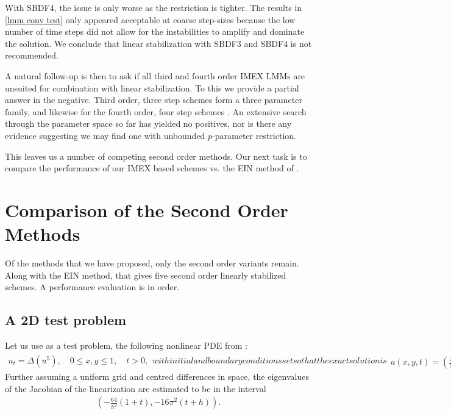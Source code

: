With SBDF4, the issue is only worse as the restriction is tighter. The results in \cref{lmm conv test} only appeared acceptable at coarse step-sizes because the low number of time steps did not allow for the instabilities to amplify and dominate the solution. We conclude that linear stabilization with SBDF3 and SBDF4  is not recommended. 

A natural follow-up is then to ask if all third and fourth order IMEX LMMs are unsuited for combination with linear stabilization. To this we provide a partial answer in the negative. Third order, three step schemes form a three parameter family, and likewise for the fourth order, four step schemes \cite{ascher1995implicit}. An extensive search through the parameter space so far has yielded no positives, nor is there any evidence suggesting we may find one with unbounded $p$-parameter restriction.

This leaves us a number of competing second order methods. Our next task is to compare the performance of our IMEX based schemes vs. the EIN method of \cite{duchemin2014explicit}.

\section{Comparison of the Second Order Methods}
Of the methods that we have proposed, only the second order variants remain. Along with the EIN method, that gives five second order linearly stabilized schemes. A performance evaluation is in order.

\subsection{A 2D test problem}
Let us use as a test problem, the following nonlinear PDE from \cite{vdHouwen1982on}:
\begin{subequations}
        \begin{align}
                u_t = \Delta (u^5),
\quad 0\leq x,y\leq 1,
\quad t > 0,
\label{nl5a}
        \end{align}
with initial and boundary conditions set so that the exact solution is 
\begin{align}
u(x,y,t) = \left(\frac{4}{5}(2t+x+y)\right)^{1/4}.
\label{nl5b}
\end{align}
\label{nl5}
\end{subequations}
Further assuming a uniform grid and centred differences in space, the eigenvalues of the Jacobian of the linearization are estimated to be in the interval
\begin{align}
        \left(-\frac{64}{h^2}(1+t), -16\pi^2(t+h) \right).
\label{nl5 eigs}
\end{align}


